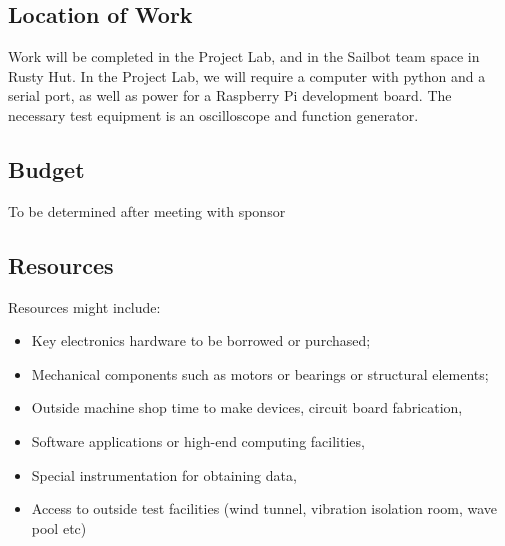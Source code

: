 \subsection{\label{sec:resources:location-of-work}Location of Work}
Work will be completed in the Project Lab, and in the Sailbot team space in Rusty Hut. In the Project Lab, we will require a computer with python and a serial port, as well as power for a Raspberry Pi development board. The necessary test equipment is an oscilloscope and function generator.

\subsection{\label{sec:resources:budget}Budget}
To be determined after meeting with sponsor

\subsection{\label{sec:resources:resources}Resources}
Resources might include:
\begin{itemize}
\item Key electronics hardware to be borrowed or purchased;
\item Mechanical components such as motors or bearings or structural elements;
\item Outside machine shop time to make devices, circuit board fabrication,
\item Software applications or high-end computing facilities,
\item Special instrumentation for obtaining data,
\item Access to outside test facilities (wind tunnel, vibration isolation room, wave pool etc)
\end{itemize}
